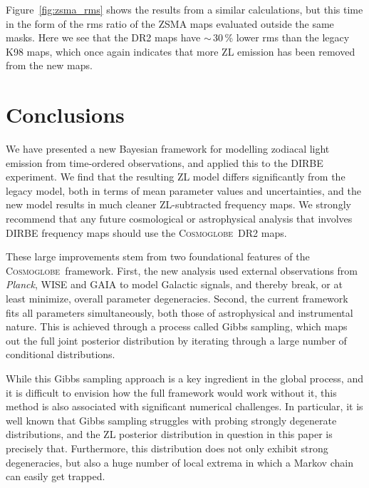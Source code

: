 \documentclass[twocolumn]{aa}
\def\Planck{\textit{Planck}}
\newcommand{\cosmoglobe}{\textsc{Cosmoglobe}}
\begin{document}
Figure~\ref{fig:zsma_rms} shows the results from a similar
calculations, but this time in the form of the rms ratio of the ZSMA
maps evaluated outside the same masks. Here we see that the DR2 maps
have $\sim$\,30\,\% lower rms than the legacy K98 maps, which once
again indicates that more ZL emission has been removed from the
new maps.









\section{Conclusions}
\label{sec:conclusions}

We have presented a new Bayesian framework for modelling zodiacal
light emission from time-ordered observations, and applied this to the
DIRBE experiment. We find that the resulting ZL model differs
significantly from the legacy model, both in terms of mean parameter
values and uncertainties, and the new model results in much cleaner
ZL-subtracted frequency maps. We strongly recommend that any future
cosmological or astrophysical analysis that involves DIRBE frequency
maps should use the \cosmoglobe\ DR2 maps.

These large improvements stem from two foundational features of the
\cosmoglobe\ framework. First, the new analysis used external
observations from \Planck, WISE and GAIA to model Galactic signals,
and thereby break, or at least minimize, overall parameter
degeneracies. Second, the current framework fits all parameters
simultaneously, both those of astrophysical and instrumental
nature. This is achieved through a process called Gibbs sampling,
which maps out the full joint posterior distribution by iterating
through a large number of conditional distributions.

While this Gibbs sampling approach is a key ingredient in the global
process, and it is difficult to envision how the full framework would
work without it, this method is also associated with significant
numerical challenges. In particular, it is well known that Gibbs
sampling struggles with probing strongly degenerate distributions, and
the ZL posterior distribution in question in this paper is precisely
that. Furthermore, this distribution does not only exhibit strong
degeneracies, but also a huge number of local extrema in which a
Markov chain can easily get trapped.
\end{document}
